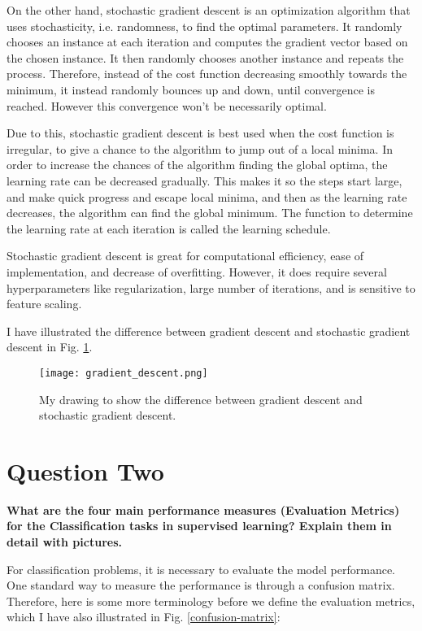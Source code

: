 \documentclass{article}
\begin{document}
On the other hand, stochastic gradient descent is an optimization algorithm that uses stochasticity, i.e. randomness, to find the optimal parameters. It randomly chooses an instance at each iteration and computes the gradient vector based on the chosen instance. It then randomly chooses another instance and repeats the process. Therefore, instead of the cost function decreasing smoothly towards the minimum, it instead randomly bounces up and down, until convergence is reached. However this convergence won't be necessarily optimal.

Due to this, stochastic gradient descent is best used when the cost function is irregular, to give a chance to the algorithm to jump out of a local minima. In order to increase the chances of the algorithm finding the global optima, the learning rate can be decreased gradually. This makes it so the steps start large, and make quick progress and escape local minima, and then as the learning rate decreases, the algorithm can find the global minimum. The function to determine the learning rate at each iteration is called the learning schedule.

Stochastic gradient descent is great for computational efficiency, ease of implementation, and decrease of overfitting. However, it does require several hyperparameters like regularization, large number of iterations, and is sensitive to feature scaling.

I have illustrated the difference between gradient descent and stochastic gradient descent in Fig. \ref{gradient-descent}.

\begin{figure}
    \centering
    \texttt{[image: gradient\_descent.png]}
    \caption{My drawing to show the difference between gradient descent and stochastic gradient descent.}
    \label{gradient-descent}
\end{figure}

\section{Question Two}
\noindent \textbf{What are the four main performance measures (Evaluation Metrics) for the Classification tasks in supervised learning? Explain them in detail with pictures.}

For classification problems, it is necessary to evaluate the model performance. One standard way to measure the performance is through a confusion matrix. Therefore, here is some more terminology before we define the evaluation metrics, which I have also illustrated in Fig. \ref{confusion-matrix}:
\end{document}
